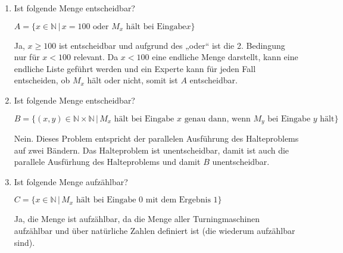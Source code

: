 \documentclass{lehramt-informatik-aufgabe}
\begin{document}
\begin{enumerate}


\item Ist folgende Menge entscheidbar?

$A = \{ x \in \mathbb{N} \,|\, x = 100 \text{ oder } M_x \text{ hält bei Eingabe
} x \}$

\begin{liAntwort}
Ja, $x \geq 100$ ist entscheidbar und aufgrund des „oder“ ist die 2.
Bedingung nur für $x < 100$ relevant. Da $x < 100$ eine endliche Menge
darstellt, kann eine endliche Liste geführt werden und ein Experte kann
für jeden Fall entscheiden, ob $M_x$ hält oder nicht, somit ist $A$
entscheidbar.
\end{liAntwort}


\item Ist folgende Menge entscheidbar?

$B = \{
(x, y) \in \mathbb{N} \times \mathbb{N}
\,| \,
M_x
\text{ hält bei Eingabe }
x
\text{ genau dann, wenn }
M_y
\text{ bei Eingabe }
y
\text{ hält}
\}$

\begin{liAntwort}
Nein. Dieses Problem entspricht der parallelen Ausführung des
Halteproblems auf zwei Bändern. Das Halteproblem ist unentscheidbar,
damit ist auch die parallele Ausfürhung des Halteproblems und damit $B$
unentscheidbar.
\end{liAntwort}


\item Ist folgende Menge aufzählbar?

$C = \{
x \in \mathbb{N}
\,|\,
M_x
\text{ hält bei Eingabe }
0
\text{ mit dem Ergebnis }
1
\}$

\begin{liAntwort}
Ja, die Menge ist aufzählbar, da die Menge aller Turningmaschinen
aufzählbar und über natürliche Zahlen definiert ist (die wiederum
aufzählbar sind).
\end{liAntwort}
\end{enumerate}
\end{document}
